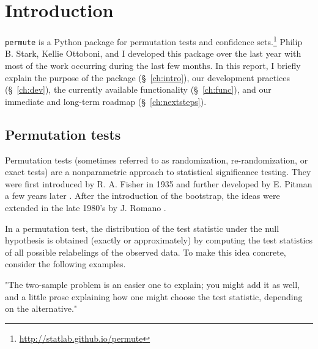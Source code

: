 \chapter{\label{ch:intro}Introduction}

\texttt{permute} is a Python package for permutation tests and confidence
sets.\footnote{\url{http://statlab.github.io/permute}}
Philip B. Stark, Kellie Ottoboni, and I developed this package over the
last year with most of the work occurring during the last few months.
In this report, I briefly explain the purpose of the package (\S~\ref{ch:intro}), our
development practices (\S~\ref{ch:dev}), the currently available functionality (\S~\ref{ch:func}), and
our immediate and long-term roadmap (\S~\ref{ch:nextsteps}).

\section{Permutation tests}

Permutation tests (sometimes referred to as randomization, re-randomization, or
exact tests) are a nonparametric approach to statistical significance testing.
They were first introduced by R. A. Fisher in 1935 and further developed by E.
Pitman a few years later \cite{fisher1935design, pitman1937, pitman1937II,
pitman1938significance}.  After the introduction of the bootstrap, the ideas
were extended in the late 1980's by J. Romano \cite{romano1988bootstrap,
romano1989bootstrap}.

In a permutation test, the distribution of the test statistic under the null
hypothesis is obtained (exactly or approximately) by computing the test
statistics of all possible relabelings of the observed data.  To make this
idea concrete, consider the following examples.


\begin{exmp}
"The two-sample problem is an easier one to explain; you might add it as well,
and a little prose explaining how one might choose the test statistic,
depending on the alternative."
\end{exmp}

